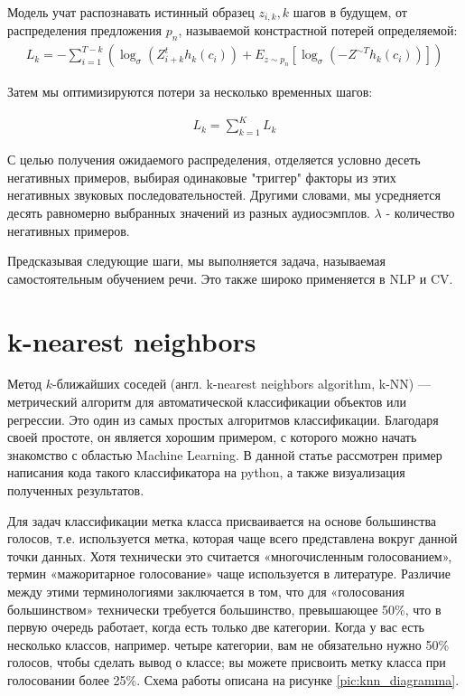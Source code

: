 Модель учат распознавать истинный образец $z_{i,k}, k$ шагов в будущем, от распределения предложения $p_n$, называемой констрастной потерей определяемой: 
\begin{equation}
  \begin{gathered}
    L_k = - \sum_{i = 1}^{T-k}(\log_\sigma(Z_{i+k}^t h_k (c_i)) + E_{z \sim p_n} \left[ \log_\sigma(- Z^{\sim T} h_k (c_i))\right])
  \end{gathered}
  \label{eq:speach_formula_14}
\end{equation}

Затем мы оптимизируются потери за несколько временных шагов:

\begin{equation}
  \begin{gathered}
    L_k = \sum_{k = 1}^{K} L_k
  \end{gathered}
  \label{eq:speach_formula_15}
\end{equation}

С целью получения ожидаемого распределения, отделяется условно десеть негативных 
примеров, выбирая одинаковые "триггер" факторы из этих негативных звуковых 
последовательностей. Другими словами, мы усредняется десять равномерно выбранных значений из разных аудиосэмплов.
$\lambda$ - количество негативных примеров.

Предсказывая следующие шаги, мы выполняется задача, называемая самостоятельным обучением речи.
Это также широко применяется в NLP и CV.

\section{k-nearest neighbors}

Метод $k$-ближайших соседей (англ. k-nearest neighbors algorithm, k-NN) — метрический 
алгоритм для автоматической классификации объектов или регрессии.
Это один из самых простых алгоритмов классификации.
Благодаря своей простоте, он является хорошим примером, 
с которого можно начать знакомство с областью Machine Learning. 
В данной статье рассмотрен пример написания кода такого 
классификатора на python, а также визуализация полученных результатов.

Для задач классификации метка класса присваивается на основе большинства голосов, 
т.е. используется метка, которая чаще всего представлена вокруг данной точки данных. 
Хотя технически это считается «многочисленным голосованием», термин «мажоритарное 
голосование» чаще используется в литературе. Различие между этими терминологиями 
заключается в том, что для «голосования большинством» технически требуется большинство, 
превышающее 50\%, что в первую очередь работает, когда есть только две категории. 
Когда у вас есть несколько классов, например. четыре категории, вам не обязательно нужно 50\%
голосов, чтобы сделать вывод о классе; вы можете присвоить метку класса при голосовании более 25\%.
Схема работы описана на рисунке \ref{pic:knn_diagramma}.

